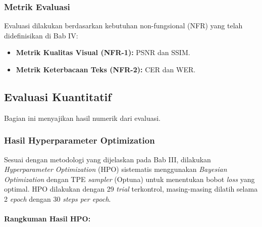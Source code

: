 \documentclass{article}
\begin{document}
\subsubsection{Metrik Evaluasi}
Evaluasi dilakukan berdasarkan kebutuhan non-fungsional (NFR) yang telah didefinisikan di Bab IV:
\begin{itemize}
    \item \textbf{Metrik Kualitas Visual (NFR-1):} PSNR dan SSIM.
    \item \textbf{Metrik Keterbacaan Teks (NFR-2):} CER dan WER.
\end{itemize}

\subsection{Evaluasi Kuantitatif}

Bagian ini menyajikan hasil numerik dari evaluasi.

\subsubsection{Hasil Hyperparameter Optimization}

Sesuai dengan metodologi yang dijelaskan pada Bab III, dilakukan \textit{Hyperparameter Optimization} (HPO) sistematis menggunakan \textit{Bayesian Optimization} dengan TPE \textit{sampler} (Optuna) untuk menentukan bobot \textit{loss} yang optimal. HPO dilakukan dengan 29 \textit{trial} terkontrol, masing-masing dilatih selama 2 \textit{epoch} dengan 30 \textit{steps per epoch}.

\paragraph{Rangkuman Hasil HPO:}
\end{document}
